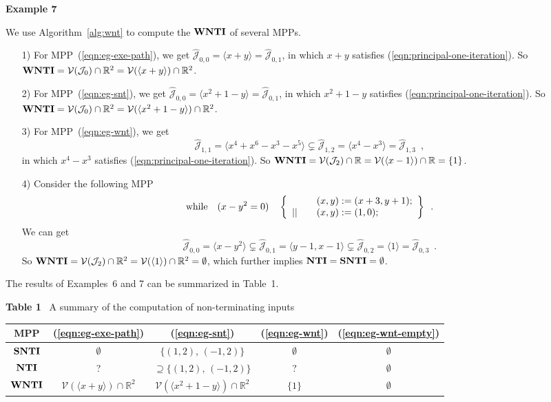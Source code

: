 \documentclass{article}
\newcommand{\while}{{\rm while}}
\newcommand{\J}{\mathcal{J}}
\newcommand{\V}{\mathcal{V}}
\newcommand{\NTI}{{\bf NTI}}
\newcommand{\SNTI}{{\bf SNTI}}
\newcommand{\WNTI}{{\bf WNTI}}
\begin{document}
{\bf Example 7}~~{We use Algorithm~\ref{alg:wnt} to compute the $\WNTI$ of several MPPs.
\begin{enumerate}
\item[1)] For MPP~(\ref{eqn:eg-exe-path}), we get $\hat{\J}_{0,0}= \langle x+y \rangle = \hat{\J}_{0,1}$, in which $x+y$ satisfies (\ref{eqn:principal-one-iteration}). So $\WNTI = \V(\J_0) \cap \mathbb{R}^2 = \V(\langle x+y \rangle) \cap \mathbb{R}^2$.
\item[2)] For MPP~(\ref{eqn:eg-snt}), we get $\hat{\J}_{0,0} = \langle x^2+1-y \rangle = \hat{\J}_{0,1}$, in which $x^2+1-y$ satisfies (\ref{eqn:principal-one-iteration}). So $\WNTI = \V(\J_0) \cap \mathbb{R}^2 = \V(\langle x^2+1-y \rangle) \cap \mathbb{R}^2$.
\item[3)] For MPP~(\ref{eqn:eg-wnt}), we get
     \[
     \hat{\J}_{1,1} = \langle x^4+x^6-x^3-x^5 \rangle \subsetneq \hat{\J}_{1,2} = \langle x^4-x^3 \rangle = \hat{\J}_{1,3} \enspace ,
     \]
     in which $x^4-x^3$ satisfies (\ref{eqn:principal-one-iteration}). So $\WNTI = \V(\J_2) \cap \mathbb{R} = \V(\langle x-1 \rangle) \cap \mathbb{R} = \{1\}$.
\item[4)] Consider the following MPP
    \begin{equation}\label{eqn:eg-wnt-empty}
    \while \quad (x-y^2=0) \quad \left\{
    \begin{array}{ll}
    & \quad (x,y) := (x+3,y+1); \\
    || & \quad (x,y) := (1,0); \\
    \end{array}
    \right\} \enspace .
    \end{equation}
    We can get
    \[
    \hat{\J}_{0,0} = \langle x-y^2 \rangle \subsetneq \hat{\J}_{0,1} = \langle y-1,x-1 \rangle \subsetneq \hat{\J}_{0,2} = \langle 1 \rangle = \hat{\J}_{0,3} \enspace .
    \]
    So $\WNTI = \V(\J_2) \cap \mathbb{R}^2 = \V(\langle 1 \rangle) \cap \mathbb{R}^2 = \emptyset$, which further implies $\NTI=\SNTI=\emptyset$.
\end{enumerate}
}

The results of Examples~6 and 7 can be summarized in Table~1.
\begin{table}
\begin{center}
{\small{\bf Table 1}~  A summary of the computation of non-terminating inputs}\vskip3mm
\begin{tabular}{|c|c|c|c|c|}
  \hline
  MPP & (\ref{eqn:eg-exe-path}) & (\ref{eqn:eg-snt}) & (\ref{eqn:eg-wnt}) & (\ref{eqn:eg-wnt-empty}) \\
  \hline
  $\SNTI$ & $\emptyset$ & $\{(1,2),\,(-1,2)\}$ & $\emptyset$ & $\emptyset$ \\
  $\NTI$ & ? & $\supseteq \{(1,2),\,(-1,2)\} $ & ? & $\emptyset$ \\
  $\WNTI$ & $\V(\langle x+y\rangle) \cap \mathbb{R}^2$ & $\V(\langle x^2+1-y \rangle ) \cap \mathbb{R}^2$ & $\{1\}$ & $\emptyset$ \\
  \hline
\end{tabular}
\end{center}
\vskip-4mm
\end{table}
\end{document}
